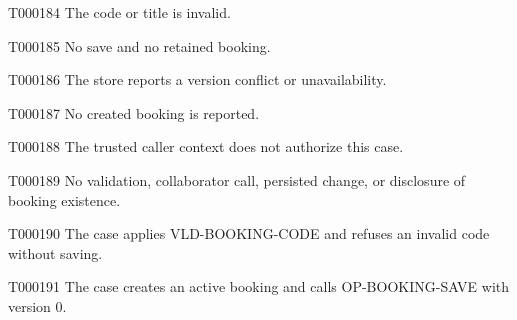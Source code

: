 \documentclass[11pt,a4paper]{article}
\begin{document}
\begin{atlasparagraph}{T000184}
The code or title is invalid.
\end{atlasparagraph}
\begin{atlasparagraph}{T000185}
No save and no retained booking.
\end{atlasparagraph}
\begin{atlasparagraph}{T000186}
The store reports a version conflict or unavailability.
\end{atlasparagraph}
\begin{atlasparagraph}{T000187}
No created booking is reported.
\end{atlasparagraph}
\begin{atlasparagraph}{T000188}
The trusted caller context does not authorize this case.
\end{atlasparagraph}
\begin{atlasparagraph}{T000189}
No validation, collaborator call, persisted change, or disclosure of booking existence.
\end{atlasparagraph}
\begin{atlasparagraph}{T000190}
The case applies VLD-BOOKING-CODE and refuses an invalid code without saving.
\end{atlasparagraph}
\begin{atlasparagraph}{T000191}
The case creates an active booking and calls OP-BOOKING-SAVE with version 0.
\end{atlasparagraph}
\end{document}
